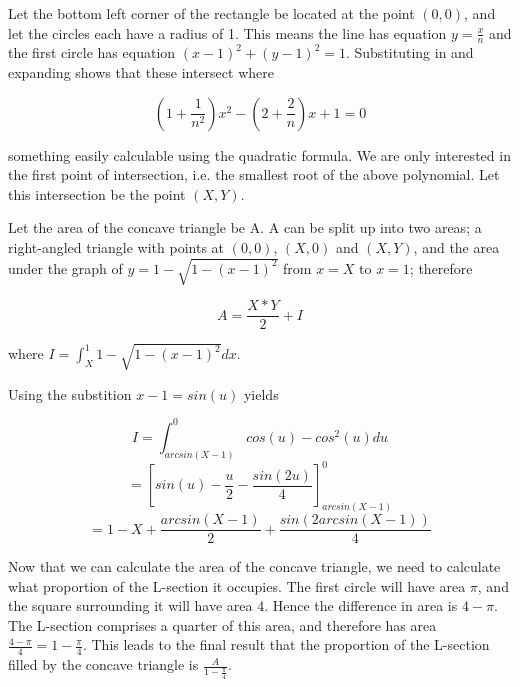 \documentclass{article}
\begin{document}
Let the bottom left corner of the rectangle be located at the point $(0,0)$, and let the circles each have a radius of 1. This means the line has equation $y=\frac{x}{n}$ and the first circle has equation $(x-1)^2 + (y-1)^2 = 1$. Substituting in and expanding shows that these intersect where

$$ (1+\frac{1}{n^2})x^2 - (2+\frac{2}{n})x + 1 = 0 $$

something easily calculable using the quadratic formula. We are only interested in the first point of intersection, i.e. the smallest root of the above polynomial. Let this intersection be the point $(X, Y)$.

Let the area of the concave triangle be A. A can be split up into two areas; a right-angled triangle with points at $(0,0)$, $(X,0)$ and $(X,Y)$, and the area under the graph of $y = 1 - \sqrt{1-(x-1)^2}$ from $x=X$ to $x=1$; therefore

$$ A = \frac{X*Y}{2} + I $$

where $I = \int_{X}^1 1-\sqrt{1-(x-1)^2} dx$.

Using the substition $x-1=sin(u)$ yields

$$ I = \int_{arcsin(X-1)}^0 cos(u) - cos^2(u) du $$
$$ = \left[ sin(u) - \frac{u}{2} - \frac{sin(2u)}{4} \right]_{arcsin(X-1)}^0 $$
$$ = 1 - X + \frac{arcsin(X-1)}{2} + \frac{sin(2arcsin(X-1))}{4} $$

Now that we can calculate the area of the concave triangle, we need to calculate what proportion of the L-section it occupies. The first circle will have area $\pi$, and the square surrounding it will have area $4$. Hence the difference in area is $4-\pi$. The L-section comprises a quarter of this area, and therefore has area $\frac{4-\pi}{4} = 1 - \frac{\pi}{4}$. This leads to the final result that the proportion of the L-section filled by the concave triangle is $\frac{A}{1-\frac{\pi}{4}}$.
\end{document}
